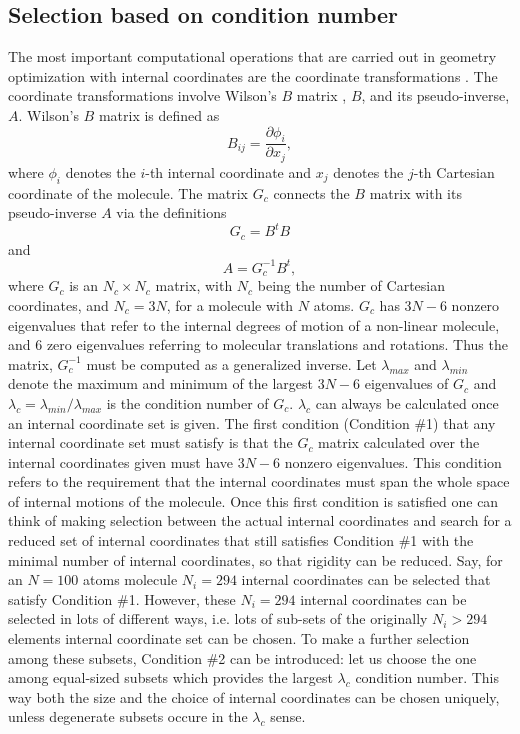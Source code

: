 \documentclass[prl,aps,preprint,superbib,12pt]{revtex4}
\begin{document}
\subsection{Selection based on condition number}
The most important computational operations 
that are carried out in geometry optimization 
with internal coordinates are the coordinate transformations 
\cite{PPulay77}. The coordinate transformations involve
Wilson's $B$ matrix \cite{EWilson55}, $B$, and its pseudo-inverse, $A$.
Wilson's $B$ matrix is defined as
\begin{equation}
B_{ij} = \frac{\partial \phi_{i}}{\partial x_{j}},
\end{equation}
where $\phi_{i}$ denotes the $i$-th internal coordinate and $x_{j}$
denotes the $j$-th Cartesian coordinate of the molecule.
The matrix $G_{c}$ connects the $B$ matrix with its pseudo-inverse
$A$ via the definitions
\begin{equation}
G_{c} = B^{t} B
\end{equation}
and
\begin{equation}
A = G_{c}^{-1} B^{t} ,
\end{equation}
where $G_{c}$ is an $N_{c} \times N_{c}$ matrix, with $N_{c}$ being the
number of Cartesian coordinates, and $N_{c}=3N$, for a molecule
with $N$ atoms. $G_{c}$ has $3N-6$ nonzero eigenvalues that refer to 
the internal degrees of motion of a non-linear molecule, and
$6$ zero eigenvalues referring to molecular translations and rotations. 
Thus the
matrix, $G_{c}^{-1}$ must be computed as a generalized inverse. 
Let $\lambda_{max}$ and $\lambda_{min}$ denote the maximum and minimum
of the largest $3N-6$ eigenvalues of $G_{c}$ and 
$\lambda_{c}=\lambda_{min}/\lambda_{max}$ is the condition number
of $G_{c}$. 
$\lambda_{c}$ can always be calculated once
an internal coordinate set is given. 
The first condition (Condition \#1) that any internal coordinate set
must satisfy is that the $G_{c}$ matrix calculated over the 
internal coordinates given must have $3N-6$ nonzero eigenvalues. 
This condition refers to the requirement
that the internal coordinates must span the whole space 
of internal motions of the molecule.
Once this first condition is satisfied one can think of making
selection between the actual internal coordinates and search
for a reduced set of internal coordinates that still satisfies 
Condition \#1 with the minimal number of internal coordinates, so that
rigidity can be reduced.
Say, for an $N=100$ atoms molecule $N_{i}=294$ internal coordinates
can be selected that satisfy Condition \#1. However, these $N_{i}=294$
internal coordinates can be selected in lots of different ways,
i.e. lots of sub-sets of the originally $N_{i}>294$ elements internal
coordinate set can be chosen. To make a further selection
among these subsets, Condition \#2 can be introduced:
let us choose the one among equal-sized subsets which provides the
largest $\lambda_{c}$ condition number. This way both
the size and the choice of internal coordinates can be chosen
uniquely, unless degenerate subsets occure in the $\lambda_{c}$ sense.
\end{document}
